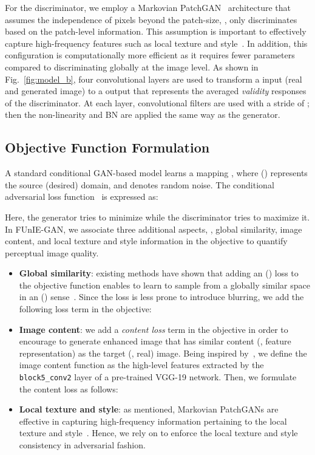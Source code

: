 \documentclass[10pt,twocolumn,letterpaper]{article}
\begin{document}
For the discriminator, we employ a Markovian PatchGAN~\cite{isola2017image} architecture that assumes the independence of pixels beyond the patch-size, \ie, only discriminates based on the patch-level information. This assumption is important to effectively capture high-frequency features such as local texture and style~\cite{yi2017dualgan}. In addition, this configuration is computationally more efficient as it requires fewer parameters compared to discriminating globally at the image level. As shown in Fig.~\ref{fig:model_b}, four convolutional layers are used to transform a  input (real and generated image) to a  output that represents the averaged \textit{validity} responses of the discriminator. At each layer,  convolutional filters are used with a stride of ; then the non-linearity and BN are applied the same way as the generator. 


\subsection{Objective Function Formulation}\label{obj_fun}
A standard conditional GAN-based model learns a mapping , where  () represents the source (desired) domain, and  denotes random noise. The conditional adversarial loss function~\cite{mirza2014conditional} is expressed as:   

Here, the generator  tries to minimize  while the discriminator  tries to maximize it. In FUnIE-GAN, we associate three additional aspects, \ie, global similarity, image content, and local texture and style information in the objective to quantify perceptual image quality.    

\begin{itemize}
    \item \textbf{Global similarity}: existing methods have shown that adding an  () loss to the objective function enables  to learn to sample from a globally similar space in an  () sense~\cite{isola2017image,yu2018underwater}. Since the  loss is less prone to introduce blurring, we add the following loss term in the objective:     
        


    \item \textbf{Image content}: we add a \textit{content loss} term in the objective in order to encourage  to generate enhanced image that has similar content (\ie, feature representation) as the target (\ie, real) image. Being inspired by~\cite{johnson2016perceptual,ignatov2017dslr}, we define the image content function  as the high-level features extracted by the {\tt block5\_conv2} layer of a pre-trained VGG-19 network. Then, we formulate the content loss as follows:     
            

   \item \textbf{Local texture and style}: as mentioned, Markovian PatchGANs are effective in capturing high-frequency information pertaining to the local texture and style~\cite{isola2017image}. Hence, we rely on  to enforce the local texture and style consistency in adversarial fashion.
\end{itemize}
\end{document}
